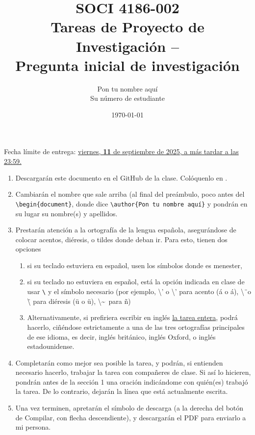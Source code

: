 \documentclass[11pt]{article}
\title{SOCI 4186-002\\ Tareas de Proyecto de Investigación --\textnumero 1 \\ Pregunta inicial de investigación}
\author{Pon tu nombre aquí \\ Su número de estudiante}
\date{\today}
\begin{document}
\singlespacing
\maketitle
\onehalfspacing
\begin{center}
    Fecha límite de entrega: \underline{viernes, \textbf{11} de septiembre de 2025, a más tardar a las 23:59.}
\end{center}


\begin{enumerate}
    \item Descargarán este documento en el GitHub de la clase. Colóquenlo en .
    \item Cambiarán el nombre que sale arriba (al final del preámbulo, poco antes del \texttt{\textbackslash begin\{document\}}, donde dice \texttt{\textbackslash author\{Pon tu nombre aquí\}} y pondrán en su lugar su nombre(s) y apellidos.
    \item Prestarán atención a la ortografía de la lengua española, asegurándose de colocar acentos, diéresis, o tildes donde deban ir. Para esto, tienen dos opciones 
    \begin{enumerate}
        \item si su teclado estuviera en español, usen los símbolos donde es menester,
        \item si su teclado no estuviera en español, está la opción indicada en clase de usar \texttt{\textbackslash} y el símbolo necesario (por ejemplo, \textbackslash' o \textbackslash'{} para acento (\'a o \'{a}), \textbackslash\"\ o \textbackslash\"{} para diéresis (\"u o \"{u}), \textbackslash\textasciitilde\ para \~n)
        \item Alternativamente, si prefiriera escribir en inglés \underline{la tarea entera}, podrá hacerlo, ciñéndose estrictamente a una de las tres ortografías principales de ese idioma, es decir, inglés británico, inglés Oxford, o inglés estadounidense.
    \end{enumerate}
    \item Completarán como mejor sea posible la tarea, y podrán, si entienden necesario hacerlo, trabajar la tarea con compañeres de clase. Si así lo hicieren, pondrán antes de la sección 1 una oración indicándome con quién(es) trabajó la tarea. De lo contrario, dejarán la línea que está actualmente escrita.
    \item  Una vez terminen, apretarán el símbolo de descarga (a la derecha del botón de Compilar, con flecha descendiente), y descargarán el PDF para enviarlo a mi persona.
\end{enumerate}
\end{document}
